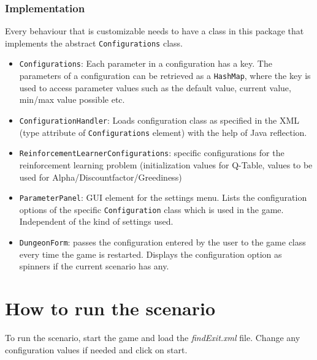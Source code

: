 \documentclass[a4paper,10pt]{scrartcl}
\begin{document}
\subsubsection{Implementation}
Every behaviour that is customizable needs to have a class in this package that implements the abstract \verb|Configurations| class.
\begin{itemize}
\item \verb|Configurations|: Each parameter in a configuration has a key. The parameters of a configuration can be retrieved as a \verb|HashMap|, where the key is used to access parameter values such as the default value, current value, min/max value possible etc. 
\item \verb|ConfigurationHandler|: Loads configuration class as specified in the XML (type attribute of \verb|Configurations| element) with the help of Java reflection.
\item \verb|ReinforcementLearnerConfigurations|: specific configurations for the reinforcement learning problem (initialization values for Q-Table, values to be used for Alpha/Discountfactor/Greediness)
\end{itemize}

\begin{itemize}
\item \verb|ParameterPanel|: GUI element for the settings menu. Lists the configuration options of the specific \verb|Configuration| class which is used in the game. Independent of the kind of settings used.
\item \verb|DungeonForm|: passes  the configuration entered by the user to the game class every time the game is restarted. Displays the configuration option as spinners if the current scenario has any.
\end{itemize}


\section{How to run the scenario}\label{sec:instructions}
To run the scenario, start the game and load the \textit{findExit.xml} file. Change any configuration values if needed and click on start.  
\end{document}
